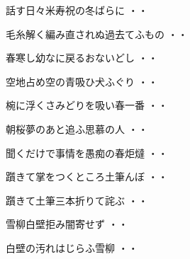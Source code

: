 \begin{shiika}話す日々米寿祝の冬ばらに
\hfill{・・}\end{shiika}
\vspace{0.6cm}
\begin{shiika}毛糸解く編み直されぬ過去てふもの
\hfill{・・}\end{shiika}
\vspace{0.6cm}
\begin{shiika}春寒し幼なに戻るおないどし
\hfill{・・}\end{shiika}
\vspace{0.6cm}
\begin{shiika}空地占め空の青吸ひ犬ふぐり
\hfill{・・}\end{shiika}
\vspace{0.6cm}
\begin{shiika}椀に浮くさみどりを吸い春一番
\hfill{・・}\end{shiika}
\vspace{0.6cm}
\begin{shiika}朝桜夢のあと追ふ思慕の人
\hfill{・・}\end{shiika}
\vspace{0.6cm}
\begin{shiika}聞くだけで事情を愚痴の春炬燵
\hfill{・・}\end{shiika}
\vspace{0.6cm}
\begin{shiika}躓きて掌をつくところ土筆んぼ
\hfill{・・}\end{shiika}
\vspace{0.6cm}
\begin{shiika}躓きて土筆三本折りて詫ぶ
\hfill{・・}\end{shiika}
\vspace{0.6cm}
\begin{shiika}雪柳白壁拒み闇寄せず
\hfill{・・}\end{shiika}
\vspace{0.6cm}
\begin{shiika}白壁の汚れはじらふ雪柳
\hfill{・・}\end{shiika}
\vspace{0.6cm}
